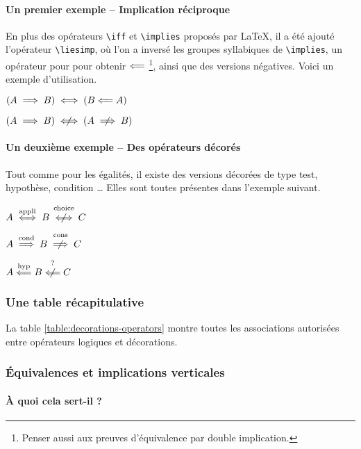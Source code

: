 \documentclass[12pt,a4paper]{article}
\newcommand\env[1]{\texttt{#1}}
\newcommand\macro[1]{\env{\textbackslash{}#1}}
\theoremstyle{definition}
\begin{document}
\paragraph{Un premier exemple -- Implication réciproque}

En plus des opérateurs \macro{iff} et \macro{implies} proposés par \LaTeX{}, il a été ajouté l'opérateur \macro{liesimp}, où l'on a inversé les groupes syllabiques de \macro{implies}, un opérateur pour pour obtenir $\mathrel{\Longleftarrow}$
\footnote{
	Penser aussi aux preuves d'équivalence par double implication.
},
ainsi que des versions négatives. Voici un exemple d'utilisation.

\begin{latexex}
$(A \implies B)
 \iff (B \mathrel{\Longleftarrow} A)$

$(A \implies B)
 \notiff (A \notimplies B)$
\end{latexex}




\paragraph{Un deuxième exemple -- Des opérateurs décorés}

Tout comme pour les égalités, il existe des versions décorées de type test, hypothèse, condition \dots{} 
Elles sont toutes présentes dans l'exemple suivant.

\begin{latexex}
$A \iffappli B \notiffchoice C$

$A \impliescond B \notimpliescons C$

$A \liesimphyp B \notliesimptest C$
\end{latexex}


\subsubsection{Une table récapitulative}

La table \ref{table:decorations-operators}  montre toutes les associations autorisées entre opérateurs logiques et décorations.




\subsubsection{Équivalences et implications verticales}

\paragraph{À quoi cela sert-il ?}
\end{document}
